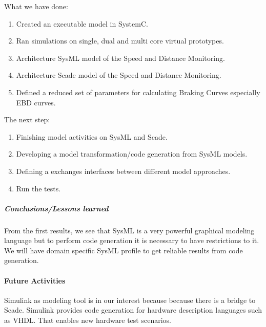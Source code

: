 \documentclass{article}
\begin{document}
What we have done:
\begin{enumerate}
\item Created an executable model in SystemC.
\item Ran simulations on single, dual and multi core virtual prototypes.
\item Architecture SysML model of the Speed and Distance Monitoring.
\item Architecture Scade model of the Speed and Distance Monitoring.
\item Defined a reduced set of parameters for calculating Braking Curves especially EBD curves.
\end{enumerate}
 
 The next step:
 \begin{enumerate}
 \item Finishing model activities on SysML and Scade.
 \item Developing a model transformation/code generation from SysML models.
 \item Defining a exchanges interfaces between different model approaches.
 \item Run the tests.
 \end{enumerate}
\subparagraph{Conclusions/Lessons learned}
From the first results, we see that SysML is a very powerful graphical modeling language but to perform code generation it is necessary to have restrictions to it. We will have domain specific SysML profile to get reliable results from code generation.  


\paragraph{Future Activities}
Simulink as modeling tool is in our interest because because there is a bridge to Scade. Simulink provides code generation for hardware description languages such as VHDL. That enables new hardware test scenarios.



\end{document}
